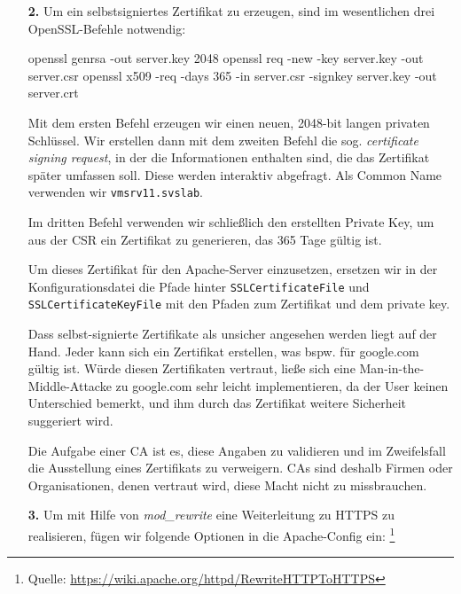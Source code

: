 \documentclass[a4paper,12bpt]{scrartcl}
\begin{document}
\begin{enumerate}
    \item[\bfseries 2.]
        Um ein selbstsigniertes Zertifikat zu erzeugen, sind im wesentlichen drei
        OpenSSL-Befehle notwendig:

        \begin{usercommands}
openssl genrsa -out server.key 2048
openssl req -new -key server.key -out server.csr
openssl x509 -req -days 365 -in server.csr -signkey server.key -out server.crt
        \end{usercommands}

        Mit dem ersten Befehl erzeugen wir einen neuen, 2048-bit langen privaten
        Schlüssel. Wir erstellen dann mit dem zweiten Befehl die sog.
        \textit{certificate signing request}, in der die Informationen enthalten
        sind, die das Zertifikat später umfassen soll. Diese werden interaktiv
        abgefragt. Als Common Name verwenden wir \texttt{vmsrv11.svslab}.

        Im dritten Befehl verwenden wir schließlich den erstellten Private Key,
        um aus der CSR ein Zertifikat zu generieren, das 365 Tage gültig ist.

        Um dieses Zertifikat für den Apache-Server einzusetzen, ersetzen wir in
        der Konfigurationsdatei die Pfade hinter \texttt{SSLCertificateFile} und
        \texttt{SSLCertificateKeyFile} mit den Pfaden zum Zertifikat und dem
        private key.

        Dass selbst-signierte Zertifikate als unsicher angesehen werden liegt auf
        der Hand. Jeder kann sich ein Zertifikat erstellen, was bspw. für google.com
        gültig ist. Würde diesen Zertifikaten vertraut, ließe sich eine Man-in-the-Middle-Attacke
        zu google.com sehr leicht implementieren, da der User keinen Unterschied
        bemerkt, und ihm durch das Zertifikat weitere Sicherheit suggeriert wird.

        Die Aufgabe einer CA ist es, diese Angaben zu validieren und im Zweifelsfall
        die Ausstellung eines Zertifikats zu verweigern. CAs sind deshalb Firmen
        oder Organisationen, denen vertraut wird, diese Macht nicht zu missbrauchen.

    \item[\bfseries 3.]
        Um mit Hilfe von \textit{mod\_rewrite} eine Weiterleitung zu HTTPS zu
        realisieren, fügen wir folgende Optionen in die Apache-Config ein:%
        \footnote{Quelle: \url{https://wiki.apache.org/httpd/RewriteHTTPToHTTPS}}


\end{enumerate}
\end{document}
